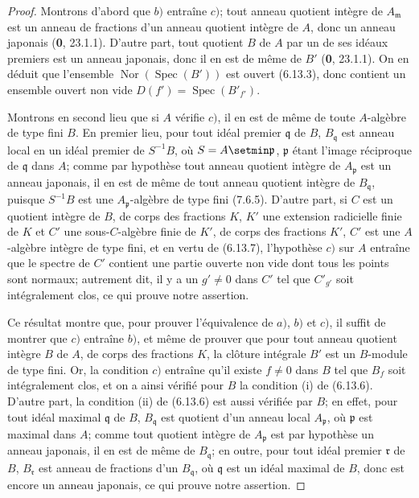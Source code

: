 \begin{proof}
Montrons d'abord que $b)$ entraîne $c)$; tout anneau quotient intègre de
$A_{\mathfrak m}$ est un anneau de fractions d'un anneau quotient intègre de
$A$, donc un anneau japonais (\textbf{0}, 23.1.1). D'autre part, tout quotient $B$ de
$A$ par un de ses idéaux premiers est un anneau japonais, donc il en est de
même de $B'$ (\textbf{0}, 23.1.1). On en déduit que l'ensemble
$\operatorname{Nor}(\operatorname{Spec}(B'))$ est ouvert (6.13.3), donc
contient un ensemble ouvert non vide
$D(f')=\operatorname{Spec}(B'_{f'})$.


Montrons en second lieu que si $A$ vérifie $c)$, il en est de même de toute
$A$-algèbre de type fini $B$. En premier lieu, pour tout idéal premier
$\mathfrak q$ de $B$, $B_{\mathfrak q}$ est anneau local en un idéal premier
de $S^{-1}B$, où $S=A\setmin\mathfrak p$, $\mathfrak p$ étant l'image réciproque de
$\mathfrak q$ dans $A$; comme par hypothèse tout anneau quotient intègre de
$A_{\mathfrak p}$ est un anneau japonais, il en est de même de tout anneau
quotient intègre de $B_{\mathfrak q}$, puisque $S^{-1}B$ est une
$A_{\mathfrak p}$-algèbre de type fini (7.6.5). D'autre part, si $C$ est un
quotient intègre de $B$, de corps des fractions $K$, $K'$ une extension
radicielle finie de $K$ et $C'$ une sous-$C$-algèbre finie de $K'$, de corps
des fractions $K'$, $C'$ est une $A$-algèbre intègre de type fini, et en vertu
de (6.13.7), l'hypothèse $c)$ sur $A$ entraîne que le spectre de $C'$ contient
une partie ouverte non vide dont tous les points sont normaux; autrement dit,
il y a un $g'\neq0$ dans $C'$ tel que $C'_{g'}$ soit intégralement clos, ce qui
prouve notre assertion.

Ce résultat montre que, pour prouver l'équivalence de $a)$, $b)$ et $c)$, il
suffit de montrer que $c)$ entraîne $b)$, et même de prouver que pour tout
anneau quotient intègre $B$ de $A$, de corps des fractions $K$, la clôture
intégrale $B'$ est un $B$-module de type fini. Or, la condition $c)$ entraîne
qu'il existe $f\neq0$ dans $B$ tel que $B_f$ soit intégralement clos, et on a
ainsi vérifié pour $B$ la condition (i) de (6.13.6). D'autre part, la condition
(ii) de (6.13.6) est aussi vérifiée par $B$; en effet, pour tout idéal maximal
$\mathfrak q$ de $B$, $B_{\mathfrak q}$ est quotient d'un anneau local
$A_{\mathfrak p}$, où $\mathfrak p$ est maximal dans $A$; comme
tout quotient intègre de $A_{\mathfrak p}$ est par hypothèse un anneau japonais, il en est de même de
$B_{\mathfrak q}$; en outre, pour tout idéal premier $\mathfrak r$ de $B$,
$B_{\mathfrak r}$ est anneau de fractions d'un $B_{\mathfrak q}$, où
$\mathfrak q$ est un idéal maximal de $B$, donc est encore un anneau japonais,
ce qui prouve notre assertion.


\end{proof}
